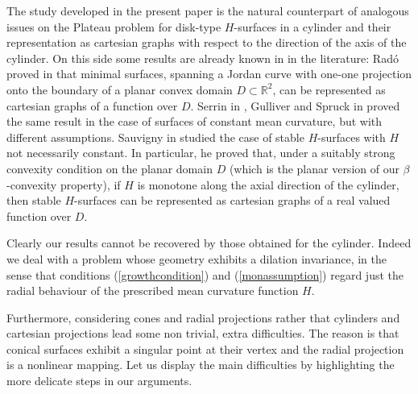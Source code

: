 \documentclass[a4paper,reqno,10pt,oneside]{amsart}
\numberwithin{equation}{section}
\begin{document}
The study developed in the present paper is the natural counterpart of analogous issues on the Plateau problem for disk-type $H$-surfaces in a cylinder and their representation as cartesian graphs with respect to the direction of the axis of the cylinder. On this side some results are already known in in the literature: Rad\'o proved in \cite{Rado} that minimal surfaces, spanning a Jordan curve with one-one projection onto the boundary of a planar convex domain $D \subset {\mathbb R}^2$, can be represented as cartesian graphs of a function over $D$. Serrin in \cite{Serrin1}, Gulliver and Spruck in \cite{GulliverSpruck1} proved the same result in the case of surfaces of constant mean curvature, but with different assumptions. Sauvigny in \cite{Sauvigny82} studied the case of stable $H$-surfaces with $H$ not necessarily constant. In particular, he proved that, under a suitably strong convexity condition on the planar domain $D$ (which is the planar version of our $\beta$-convexity property), if $H$ is monotone along the axial direction of the cylinder, then stable $H$-surfaces can be represented as cartesian graphs of a real valued function over $D$.

Clearly our results cannot be recovered by those obtained for the cylinder. Indeed we deal with a problem whose geometry exhibits a dilation invariance, in the sense that conditions (\ref{growthcondition}) and (\ref{monassumption}) regard just the radial behaviour of the prescribed mean curvature function $H$. 

Furthermore, considering cones and radial projections rather that cylinders and cartesian projections lead some non trivial, extra difficulties. The reason is that conical surfaces exhibit a singular point at their vertex and the radial projection is a nonlinear mapping. Let us display the main difficulties by highlighting the more delicate steps in our arguments. 
\end{document}
